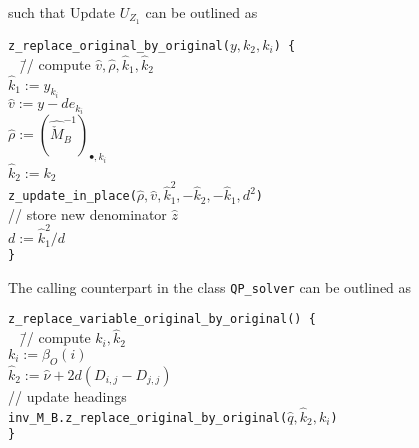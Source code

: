 \documentclass[a4paper]{article}
\begin{document}
such that Update $U_{Z_{1}}$ can be outlined as
\begin{tabbing}
\texttt{z\_replace\_original\_by\_original($y,k_{2},k_{i}$) \{}
\\
\texttt{  } \= // compute $\hat{v}, \hat{\rho}, \hat{k}_{1}, \hat{k}_{2}$ \\
\> \texttt{$\hat{k}_{1}:=y_{k_{i}}$} \\
\> \texttt{$\hat{v}:=y - de_{k_{i}}$} \\
\> \texttt{$\hat{\rho}:=
  \left(\hat{\check{M}}_{B}^{-1}\right)_{\bullet, k_{i}}$} \\
\> \texttt{$\hat{k}_{2}:=k_{2}$} \\
\> \texttt{z\_update\_in\_place($\hat{\rho}, \hat{v}, \hat{k}_{1}^{2},
-\hat{k}_{2}, -\hat{k}_{1}, d^{2}$)} \\
\> // store new denominator $\hat{z}$ \\
\> \texttt{$d:=\hat{k}_{1}^{2}/d$} \\
\texttt{\}}
\end{tabbing}
The calling counterpart in the class \texttt{QP\_solver} can be outlined as
\begin{tabbing}
\texttt{z\_replace\_variable\_original\_by\_original() \{} \\
\texttt{  } \= // compute $k_{i}, \hat{k}_{2}$ \\
\> \texttt{$k_{i}:=\beta_{O}(i)$} \\
\> \texttt{$\hat{k}_{2}:=\hat{\nu} + 2d(D_{i,j}-D_{j,j})$} \\
\> // update headings \\
\> \texttt{inv\_M\_B.z\_replace\_original\_by\_original($\hat{q},
\hat{k}_{2}, k_{i}$)} \\
\texttt{\}}
\end{tabbing}
\end{document}
